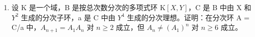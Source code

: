 \begin{enumerate}
\item
  设 K 是一个域，B 是按总次数分次的多项式环 \(\mathrm{K}[X,Y]\)，C 是 B 中由 X 和 \(Y^{2}\) 生成的分次子环，a 是 C 中由 \(Y^{4}\) 生成的分次理想。证明：在分次环 A = C/a 中，\(A_{n+1} = A_{1}A_{n}\) 对 \(n \geqslant 2\) 成立，但 \(A_{n} \neq (A_{1})^{n}\) 对 \(n \geqslant 6\) 成立。
\end{enumerate}
